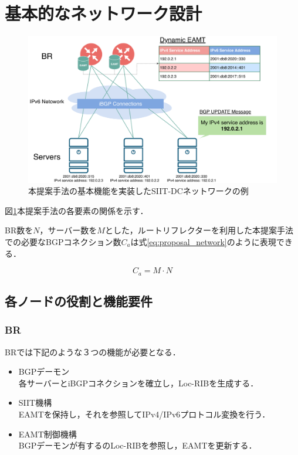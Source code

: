 \section{基本的なネットワーク設計}
\label{proposal:network}
\begin{figure}[h]
    \begin{center}
    \includegraphics[width=15cm,pagebox=cropbox,clip]{img/proposal_method_network.pdf}
    \end{center}
    \caption{本提案手法の基本機能を実装したSIIT-DCネットワークの例}
    \label{fig:proposal_method_network}
\end{figure}


図\ref{fig:proposal_method_network}本提案手法の各要素の関係を示す．

BR数を$N$，サーバー数を$M$とした，ルートリフレクターを利用した本提案手法での必要なBGPコネクション数$C_a$は式\ref{eq:proposal_network}のように表現できる．

\begin{equation}
    \label{eq:proposal_network}
    C_a = M \cdot N
\end{equation}


\subsection{各ノードの役割と機能要件}
\label{proposal:network:nodes}
\subsubsection{BR}
BRでは下記のような３つの機能が必要となる．
\begin{itemize}
    \item BGPデーモン\\
    各サーバーとiBGPコネクションを確立し，Loc-RIBを生成する．
    \item SIIT機構\\
    EAMTを保持し，それを参照してIPv4/IPv6プロトコル変換を行う．
    \item EAMT制御機構\\
    BGPデーモンが有するのLoc-RIBを参照し，EAMTを更新する．
\end{itemize}


